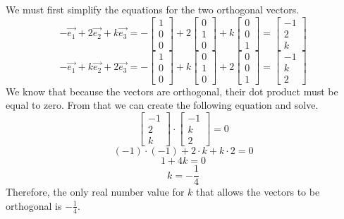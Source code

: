 \documentclass{article}
\begin{document}
We must first simplify the equations for the two orthogonal vectors.
\[-\vec{e_{1}} + 2\vec{e_{2}} + k\vec{e_{3}} = -\begin{bmatrix} 1 \\ 0 \\ 0 \end{bmatrix} + 2\begin{bmatrix} 0 \\ 1 \\ 0 \end{bmatrix} + k \begin{bmatrix} 0 \\ 0 \\ 1 \end{bmatrix} = \begin{bmatrix} -1 \\ 2 \\ k \end{bmatrix}\]
\[-\vec{e_{1}} + k\vec{e_{2}} + 2\vec{e_{3}} = -\begin{bmatrix} 1 \\ 0 \\ 0 \end{bmatrix} + k\begin{bmatrix} 0 \\ 1 \\ 0 \end{bmatrix} + 2 \begin{bmatrix} 0 \\ 0 \\ 1 \end{bmatrix} = \begin{bmatrix} -1 \\ k \\ 2 \end{bmatrix}\]
We know that because the vectors are orthogonal, their dot product must be equal to zero. From that we can create the following equation and solve.
\[\begin{bmatrix} -1 \\ 2 \\ k \end{bmatrix} \cdot \begin{bmatrix} -1 \\ k \\ 2 \end{bmatrix} = 0\]
\[(-1)\cdot(-1)+2\cdot k+k\cdot2 = 0\]
\[1+4k=0\]
\[k=-\frac{1}{4}\]
Therefore, the only real number value for $k$ that allows the vectors to be orthogonal is $-\frac{1}{4}$.
\end{document}
